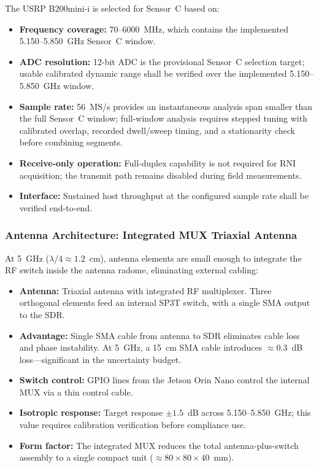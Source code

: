 \documentclass[11pt,a4paper]{article}
\begin{document}
The USRP B200mini-i is selected for Sensor~C based on:

\begin{itemize}
    \item \textbf{Frequency coverage:} 70--6000~MHz, which contains the implemented 5.150--5.850~GHz Sensor~C window.
    \item \textbf{ADC resolution:} 12-bit ADC is the provisional Sensor~C selection target; usable calibrated dynamic range shall be verified over the implemented 5.150--5.850~GHz window.
    \item \textbf{Sample rate:} 56~MS/s provides an instantaneous analysis span smaller than the full Sensor~C window; full-window analysis requires stepped tuning with calibrated overlap, recorded dwell/sweep timing, and a stationarity check before combining segments.
    \item \textbf{Receive-only operation:} Full-duplex capability is not required for RNI acquisition; the transmit path remains disabled during field measurements.
    \item \textbf{Interface:} Sustained host throughput at the configured sample rate shall be verified end-to-end.
\end{itemize}

\subsubsection{Antenna Architecture: Integrated MUX Triaxial Antenna}

At 5~GHz ($\lambda/4 \approx 1.2$~cm), antenna elements are small enough to integrate the RF switch inside the antenna radome, eliminating external cabling:

\begin{itemize}
    \item \textbf{Antenna:} Triaxial antenna with integrated RF multiplexer. Three orthogonal elements feed an internal SP3T switch, with a single SMA output to the SDR.
    \item \textbf{Advantage:} Single SMA cable from antenna to SDR eliminates cable loss and phase instability. At 5~GHz, a 15~cm SMA cable introduces $\approx 0.3$~dB loss---significant in the uncertainty budget.
    \item \textbf{Switch control:} GPIO lines from the Jetson Orin Nano control the internal MUX via a thin control cable.
    \item \textbf{Isotropic response:} Target response $\pm 1.5$~dB across 5.150--5.850~GHz; this value requires calibration verification before compliance use.
    \item \textbf{Form factor:} The integrated MUX reduces the total antenna-plus-switch assembly to a single compact unit ($\approx 80 \times 80 \times 40$~mm).
\end{itemize}
\end{document}
